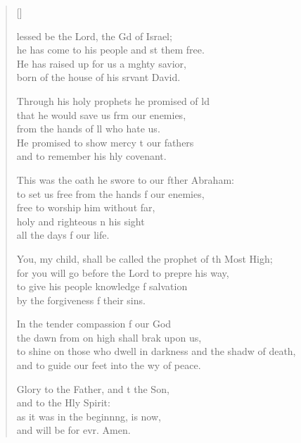 \settowidth{\versewidth}{to shine on those who dwell in darkness and the shadow of death, *}
\begin{verse}[\versewidth]
  \begin{patverse}
lessed be the Lord, the Gd of Israel;\Med\\
he has come to his people and st them free.\\
He has raised up for us a m\pointup{\i}ghty savior,\Med\\
born of the house of his srvant David.

Through his holy prophets he promised of ld\Flex\\
that he would save us frm our enemies,\Med\\
from the hands of ll who hate us.\\
He promised to show mercy t our fathers\Med\\
and to remember his hly covenant.

This was the oath he swore to our fther Abraham:\Med\\
to set us free from the hands f our enemies,\\
free to worship him without far,\Flex\\
holy and righteous \pointup{\i}n his sight\Med\\
all the days f our life.

You, my child, shall be called the prophet of th Most High;\Med\\
for you will go before the Lord to prepre his way,\\
to give his people knowledge f salvation\Med\\
by the forgiveness f their sins.

In the tender compassion f our God\Med\\
the dawn from on high shall brak upon us,\\
to shine on those who dwell in darkness and the shadw of death,\Med\\
and to guide our feet into the wy of peace.

Glory to the Father, and t the Son,\Med\\
and to the Hly Spirit:\\
as it was in the beginn\pointup{\i}ng, is now,\Med\\
and will be for evr. Amen.
  \end{patverse}
  \end{verse}
